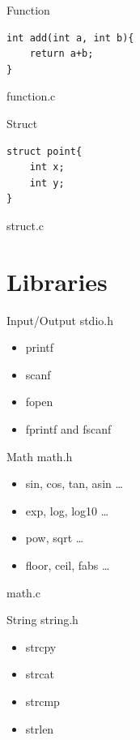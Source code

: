 \documentclass[UTF8]{beamer}
\begin{document}
\begin{frame}[t,fragile]{Function}
\begin{verbatim}
int add(int a, int b){
    return a+b;
}
\end{verbatim}
    function.c
\end{frame}

\begin{frame}[t,fragile]{Struct}
\begin{verbatim}
struct point{
    int x;
    int y;
}
\end{verbatim}
struct.c
\end{frame}


\section{Libraries}
\begin{frame}[t]{Input/Output}
    stdio.h
    \begin{itemize}
        \item printf
        \item scanf
        \item fopen
        \item fprintf and fscanf
    \end{itemize}
\end{frame}

\begin{frame}[t]{Math}
    math.h
    \begin{itemize}
        \item sin, cos, tan, asin \ldots
        \item exp, log, log10 \ldots
        \item pow, sqrt \ldots
        \item floor, ceil, fabs \ldots
    \end{itemize}
    math.c
\end{frame}

\begin{frame}[t]{String}
    string.h
    \begin{itemize}
        \item strcpy
        \item strcat
        \item strcmp
        \item strlen
    \end{itemize}
\end{frame}
\end{document}
